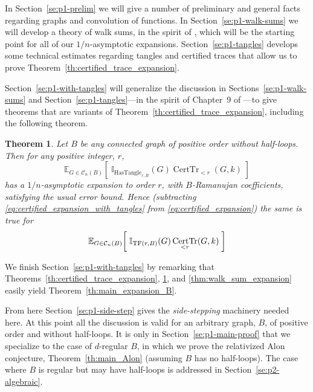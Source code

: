 \documentclass{memo-l}
\theoremstyle{plain}
\newtheorem{theorem}{Theorem}[section]
\theoremstyle{definition}
\numberwithin{section}{chapter}
\numberwithin{equation}{chapter}
\newcommand{\expect}[2]{{\mathbb{E}}_{#1}{\left[\; #2\; \right]}}
\DeclareMathOperator{\HasTangle}{HasTangle}
\DeclareMathOperator{\CertTr}{CertTr}
\theoremstyle{plain}
\theoremstyle{definition}
\newcommand\II{\mathbb{I}}
\newcommand\cC{\mathcal{C}}
\begin{document}
In Section~\ref{se:p1-prelim} we will give a number of preliminary
and general facts regarding graphs and convolution of functions.
In Section~\ref{se:p1-walk-sums} we will develop a theory of
walk sums, in the spirit of \cite{friedman_alon}, which will be
the starting point for all of our $1/n$-asymptotic expansions.
Section~\ref{se:p1-tangles} develops some technical estimates
regarding tangles and certified traces that allow us to
prove Theorem~\ref{th:certified_trace_expansion}.

Section~\ref{se:p1-with-tangles} will generalize the discussion
in Sections~\ref{se:p1-walk-sums} and Section~\ref{se:p1-tangles}---in
the spirit of Chapter~9 of \cite{friedman_alon}---to
give theorems that are variants of
Theorem~\ref{th:certified_trace_expansion}, including the following
theorem.

\begin{theorem}\label{th:certified_trace_expansion_with_tangles}
\label{TH:CERTIFIED_TRACE_EXPANSION_WITH_TANGLES}  %
Let $B$ be any connected graph of positive \gls{order} without
half-loops.  Then for any positive integer, $r$,
\begin{equation}\label{eq:certified_expansion_with_tangles}
\expect{G \in \cC_n(B)}{\II_{\HasTangle_{r,B}}(G)\CertTr_{<r}(G,k)}
\end{equation}
has a $1/n$-asymptotic expansion to order $r$, with $B$-Ramanujan coefficients,
satisfying the usual error bound.
Hence (subtracting \eqref{eq:certified_expansion_with_tangles}
from \eqref{eq:certified_expansion})
the same is true for
\begin{equation}\label{eq:certified_expansion_without_tangles}
\expect{G \in \cC_n(B)}{\II_{{\rm TF}(r,B)}(G)\CertTr_{<r}(G,k)}
\end{equation}
\end{theorem}
We finish Section~\ref{se:p1-with-tangles} by remarking that
Theorems~\ref{th:certified_trace_expansion},
\ref{th:certified_trace_expansion_with_tangles}, and
\ref{thm:walk_sum_expansion}
easily yield Theorem~\ref{th:main_expansion_B}.

From here Section~\ref{se:p1-side-step} gives the {\em side-stepping}
machinery needed here.
At this point all the discussion is valid for an arbitrary graph, $B$,
of positive order and without half-loops.
It is only in Section~\ref{se:p1-main-proof} that we specialize to the
case of $d$-regular $B$, in which we prove the relativized
Alon conjecture, Theorem~\ref{th:main_Alon} (assuming $B$ has no
half-loops).  The case where $B$ is regular but may have 
half-loops is addressed in Section~\ref{se:p2-algebraic}.
\end{document}
